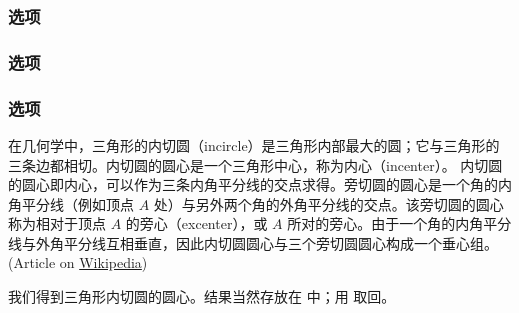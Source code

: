 \subsubsection{选项 }
\begin{tkzexample}[latex=6cm,small]
\end{tkzexample}

\subsubsection{选项 }
\begin{tkzexample}[latex=6cm,small]
\end{tkzexample}

\subsubsection{选项 }
在几何学中，三角形的内切圆（incircle）是三角形内部最大的圆；它与三角形的三条边都相切。内切圆的圆心是一个三角形中心，称为内心（incenter）。
内切圆的圆心即内心，可以作为三条内角平分线的交点求得。旁切圆的圆心是一个角的内角平分线（例如顶点 $A$ 处）与另外两个角的外角平分线的交点。该旁切圆的圆心称为相对于顶点 $A$ 的旁心（excenter），或 $A$ 所对的旁心。由于一个角的内角平分线与外角平分线互相垂直，因此内切圆圆心与三个旁切圆圆心构成一个垂心组。\\
(Article on \href{https://en.wikipedia.org/wiki/Incircle_and_excircles_of_a_triangle}{Wikipedia})

 \medskip
 我们得到三角形内切圆的圆心。结果当然存放在  中；用  取回。

\begin{tkzexample}[latex=7cm,small]
\end{tkzexample}

